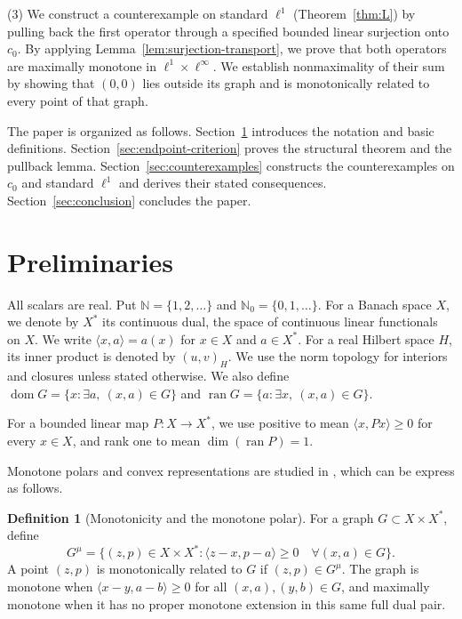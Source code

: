 \documentclass[11pt]{article}
\newcommand{\N}{\mathbb N}
\newcommand{\Nzero}{\mathbb N_0}
\newcommand{\dom}{\operatorname{dom}}
\newcommand{\pair}[2]{\langle #1,#2\rangle}
\theoremstyle{definition}
\newtheorem{definition}{Definition}
\theoremstyle{remark}
\begin{document}
(3) We construct a counterexample on standard $\ell^1$ (Theorem~\ref{thm:L}) by pulling back the first operator through a specified bounded linear surjection onto $c_0$. By applying Lemma~\ref{lem:surjection-transport}, we prove that both operators are maximally monotone in $\ell^1\times\ell^\infty$. We establish nonmaximality of their sum by showing that $(0,0)$ lies outside its graph and is monotonically related to every point of that graph. 

The paper is organized as follows. Section~\ref{sec:definitions} introduces the notation and basic definitions. Section~\ref{sec:endpoint-criterion} proves the structural theorem and the pullback lemma. Section~\ref{sec:counterexamples} constructs the counterexamples on $c_0$ and standard $\ell^1$ and derives their stated consequences. Section~\ref{sec:conclusion} concludes the paper.


\section{Preliminaries}
\label{sec:definitions}
All scalars are real. Put $\N=\{1,2,\ldots\}$ and $\Nzero=\{0,1,\ldots\}$. For a Banach space $X$, we denote by $X^*$ its continuous dual, the space of continuous linear functionals on $X$. We write $\pair{x}{a}=a(x)$ for $x\in X$ and $a\in X^*$. For a real Hilbert space $H$, its inner product is denoted by $(u,v)_H$. We use the norm topology for interiors and closures unless stated otherwise. We also define $\dom G=\{x:\exists a,\ (x,a)\in G\}$ and $\operatorname{ran}G=\{a:\exists x,\ (x,a)\in G\}$.

For a bounded linear map $P:X\to X^*$, we use positive to mean $\pair{x}{Px}\ge0$ for every $x\in X$, and rank one to mean $\dim(\operatorname{ran}P)=1$.

Monotone polars and convex representations are studied in \cite{martinezsvaiter2005,bauschkemclarensendov2006}, which can be express as follows. 

\begin{definition}[Monotonicity and the monotone polar]
For a graph $G\subset X\times X^*$, define
\begin{equation}
G^\mu=\{(z,p)\in X\times X^*:
 \pair{z-x}{p-a}\ge0\quad\forall(x,a)\in G\}.
\label{eq:D1}
\end{equation}
A point $(z,p)$ is monotonically related to $G$ if $(z,p)\in G^\mu$.
The graph is monotone when $\pair{x-y}{a-b}\ge0$ for all $(x,a),(y,b)\in G$, and maximally monotone when it has no proper monotone extension in this same full dual pair.
\end{definition}
\end{document}
